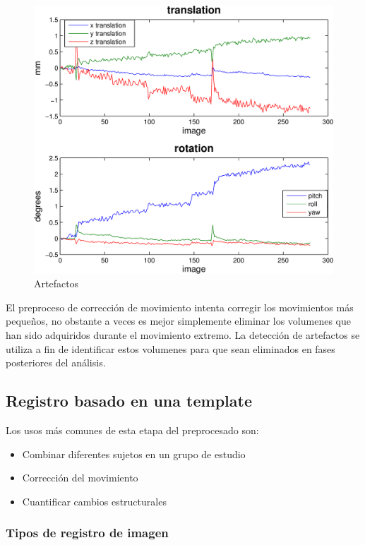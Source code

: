 \begin{figure}[H]
  \centering
    \includegraphics[scale=0.15]{img/arts.png}
  \caption{Artefactos}         \label{preproc:arts}
\end{figure}

El preproceso de corrección de movimiento intenta corregir los movimientos más pequeños, no obstante a veces es mejor simplemente eliminar los volumenes que han sido adquiridos durante el movimiento extremo. La detección de artefactos se utiliza a fin de identificar estos volumenes para que sean eliminados en fases posteriores del análisis.

\subsection{Registro basado en una template}

Los usos más comunes de esta etapa del preprocesado son:
\begin{itemize}
	\item Combinar diferentes sujetos en un grupo de estudio 
	\item Corrección del movimiento
	\item Cuantificar cambios estructurales
\end{itemize}

\subsubsection{Tipos de registro de imagen}

